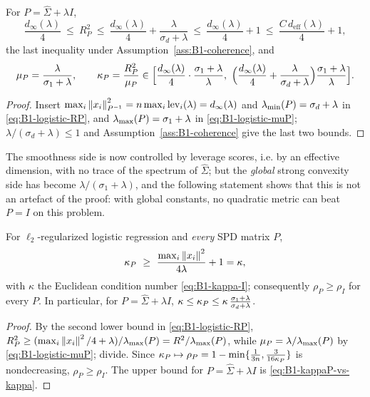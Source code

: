 \begin{proposition}\label{prop:B1-stat-global}
For $P=\hat\Sigma+\lambda I$,
\begin{equation}\label{eq:B1-stat-RP}
\frac{d_\infty(\lambda)}{4}\ \le\ R_P^2\ \le\ \frac{d_\infty(\lambda)}{4}+\frac{\lambda}{\sigma_d+\lambda}
\ \le\ \frac{d_\infty(\lambda)}4+1\ \le\ \frac{C\,d_{\mathrm{eff}}(\lambda)}{4}+1,
\end{equation}
the last inequality under Assumption~\ref{ass:B1-coherence}, and
\begin{equation}\label{eq:B1-stat-muP}
\mu_P=\frac{\lambda}{\sigma_1+\lambda},\qquad
\kappa_P=\frac{R_P^2}{\mu_P}\in\Big[\frac{d_\infty(\lambda)}{4}\cdot\frac{\sigma_1+\lambda}{\lambda},\
\Big(\frac{d_\infty(\lambda)}{4}+\frac{\lambda}{\sigma_d+\lambda}\Big)\frac{\sigma_1+\lambda}{\lambda}\Big].
\end{equation}
\end{proposition}
\begin{proof}
Insert $\max_i\left\|x_i\right\|_{P^{-1}}^2=n\max_i\mathrm{lev}_i(\lambda)=d_\infty(\lambda)$ and $\lambda_{\min}(P)=\sigma_d+\lambda$
in \eqref{eq:B1-logistic-RP}, and $\lambda_{\max}(P)=\sigma_1+\lambda$ in \eqref{eq:B1-logistic-muP};
$\lambda/(\sigma_d+\lambda)\le1$ and Assumption~\ref{ass:B1-coherence} give the last two bounds.
\end{proof}

The smoothness side is now controlled by leverage scores, i.e. by an effective dimension, with no trace of
the spectrum of $\hat\Sigma$; but the \emph{global} strong convexity side has become
$\lambda/(\sigma_1+\lambda)$, and the following statement shows that this is not an artefact of the proof:
with global constants, no quadratic metric can beat $P=I$ on this problem.

\begin{proposition}\label{prop:B1-nofreelunch}
For $\ell_2$-regularized logistic regression and \emph{every} SPD matrix $P$,
\begin{equation}\label{ineq:P-nofreelunch}
\kappa_P\ \ge\ \frac{\max_i\left\|x_i\right\|^2}{4\lambda}+1=\kappa ,
\end{equation}
with $\kappa$ the Euclidean condition number \eqref{eq:B1-kappa-I}; consequently $\rho_P\ge\rho_I$ for every
$P$. In particular, for $P=\hat\Sigma+\lambda I$, $\kappa\le\kappa_P\le\kappa\,\frac{\sigma_1+\lambda}{\sigma_d+\lambda}$.
\end{proposition}
\begin{proof}
By the second lower bound in \eqref{eq:B1-logistic-RP},
$R_P^2\ge(\max_i\left\|x_i\right\|^2/4+\lambda)/\lambda_{\max}(P)=R^2/\lambda_{\max}(P)$, while $\mu_P=\lambda/\lambda_{\max}(P)$ by
\eqref{eq:B1-logistic-muP}; divide. Since $\kappa_P\mapsto\rho_P=1-\min\{\frac1{3n},\frac3{16\kappa_P}\}$ is
nondecreasing, $\rho_P\ge\rho_I$. The upper bound for $P=\hat\Sigma+\lambda I$ is
\eqref{eq:B1-kappaP-vs-kappa}.
\end{proof}

